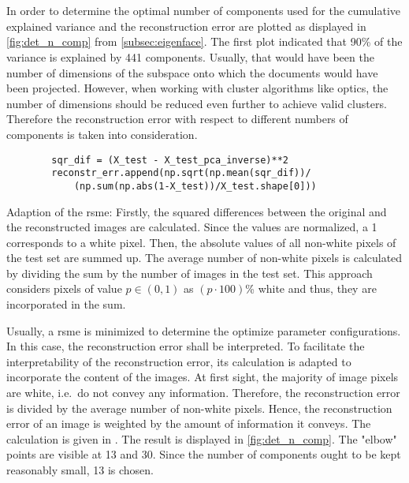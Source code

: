 \section{\eigendocs{}}\label{sec:evaluation-eigendocs}

In order to determine the optimal number of components used for \eigendocs{} the cumulative explained variance and the reconstruction error are plotted 
as displayed in \autoref{fig:det_n_comp} from \autoref{subsec:eigenface}.
The first plot indicated that 90\% of the variance is explained by 441 components.
Usually, that would have been the number of dimensions of the subspace onto which the documents would have been projected.
However, when working with cluster algorithms like \ac{optics}, the number of dimensions should be reduced even further to achieve valid clusters.
Therefore the reconstruction error with respect to different numbers of components is taken into consideration.

\begin{listing}[htp]
    \begin{verbatim}
        sqr_dif = (X_test - X_test_pca_inverse)**2
        reconstr_err.append(np.sqrt(np.mean(sqr_dif))/
            (np.sum(np.abs(1-X_test))/X_test.shape[0])) 
    \end{verbatim}
    \caption[Adaption of the \ac{rsme}]{
        Adaption of the \ac{rsme}: 
        Firstly, the squared differences between the original and the reconstructed images are calculated.
        Since the values are normalized, a 1 corresponds to a white pixel.
        Then, the absolute values of all non-white pixels of the test set are summed up.
        The average number of non-white pixels is calculated by dividing the sum by the number of images in the test set.
        This approach considers pixels of value $p \in (0,1)$ as $(p \cdot 100)$\% white and thus, they are incorporated in the sum.
    }
    \label{lst:impl-weighted-rsme}
\end{listing}

Usually, a \ac{rsme} is minimized to determine the optimize parameter configurations.
In this case, the reconstruction error shall be interpreted.
To facilitate the interpretability of the reconstruction error, its calculation is adapted to incorporate the content of the images.
At first sight, the majority of image pixels are white, i.e.\ do not convey any information.
Therefore, the reconstruction error is divided by the average number of non-white pixels. 
Hence, the reconstruction error of an image is weighted by the amount of information it conveys.
The calculation is given in .
The result is displayed in \autoref{fig:det_n_comp}.
The "elbow" points are visible at 13 and 30.
Since the number of components ought to be kept reasonably small, 13 is chosen.


